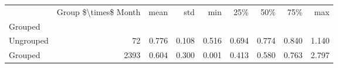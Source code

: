 \begin{tabular}{lrrrrrrrr}
\toprule
{} &  Group \$\textbackslash times\$ Month &   mean &    std &    min &    25\% &    50\% &    75\% &    max \\
Grouped   &                       &        &        &        &        &        &        &        \\
\midrule
Ungrouped &                    72 &  0.776 &  0.108 &  0.516 &  0.694 &  0.774 &  0.840 &  1.140 \\
Grouped   &                  2393 &  0.604 &  0.300 &  0.001 &  0.413 &  0.580 &  0.763 &  2.797 \\
\bottomrule
\end{tabular}
